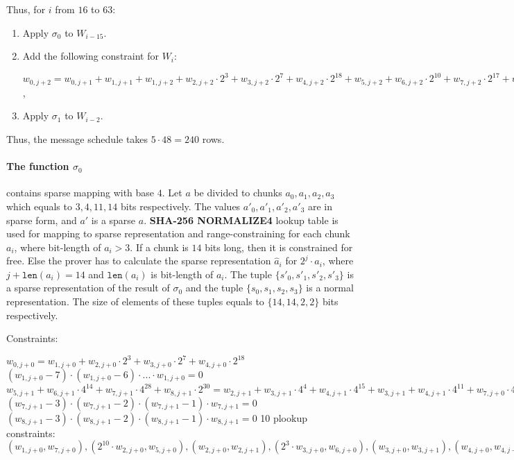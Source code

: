 Thus, for $i$ from $16$ to $63$:
\begin{enumerate}
\item Apply $\sigma_0$ to $W_{i-15}$.
\item Add the following constraint for $W_i$:
\begin{center}
	$w_{0,j + 2} = w_{0, j + 1} + w_{1, j + 1} + w_{1, j + 2} + w_{2,j + 2} \cdot 2^3 + w_{3,j + 2} \cdot 2^{7} + w_{4, j + 2} \cdot 2^{18} + w_{5, j + 2} + w_{6, j + 2} \cdot 2^{10} + w_{7,j + 2} \cdot 2^{17} + w_{8, j + 2} \cdot 2^{19}$,
\end{center}
\item Apply $\sigma_1$ to $W_{i-2}$.
\end{enumerate}
Thus, the message schedule takes $5 \cdot 48 = 240$ rows.

\paragraph{The function $\sigma_0$} contains sparse mapping with base $4$.
Let $a$ be divided to chunks $a_0, a_1, a_2, a_3$ which equals to $3, 4, 11, 14$ bits respectively.
The values $a'_0, a'_1, a'_2, a'_3$ are in sparse form, and $a'$ is a sparse $a$.
\textbf{SHA-256 NORMALIZE4} lookup table is used for mapping to sparse representation and range-constraining for each chunk $a_i$, where bit-length of $a_i > 3$.
If a chunk is $14$ bits long, then it is constrained for free.
Else the prover has to calculate the sparse representation $\hat{a}_i$ for $2^j \cdot a_i$, where $j + \texttt{len}(a_i) = 14$ and $\texttt{len}(a_i)$ is bit-length of $a_i$.
The tuple $\{ s'_0, s'_1, s'_2, s'_3\}$ is a sparse representation of the result of $\sigma_0$ and the tuple $\{ s_0, s_1, s_2, s_3\}$  is a normal representation.
The size of elements of these tuples equals to $\{14, 14, 2, 2\}$ bits respectively.

Constraints:
\begin{center}
    $w_{0, j + 0} = w_{1, j + 0} + w_{2,j + 0} \cdot 2^3 + w_{3,j + 0} \cdot 2^{7} + w_{4, j + 0} \cdot 2^{18}$ \\
    $(w_{1, j + 0} - 7) \cdot (w_{1, j + 0} - 6) \cdot ... \cdot w_{1, j + 0} = 0$ \\
    $w_{5, j + 1} + w_{6, j + 1} \cdot 4^{14} + w_{7, j + 1} \cdot 4^{28} + w_{8, j + 1} \cdot 2^{30} = w_{2, j + 1} + w_{3, j + 1} \cdot 4^{4} + w_{4, j + 1} \cdot 4^{15} + w_{3, j + 1} + w_{4, j + 1} \cdot 4^{11} + w_{7, j + 0} \cdot 4^{25} + w_{2, j + 1} \cdot 4^{28} + w_{4, j + 1} + w_{7, j + 0} \cdot 4^{14}+ w_{2, j + 1} \cdot 4^{17} + w_{3, j + 1} \cdot 4^{21}$ \\
    $(w_{7, j + 1} - 3) \cdot (w_{7, j + 1} - 2) \cdot (w_{7, j + 1} - 1) \cdot w_{7, j + 1} = 0$
    $(w_{8, j + 1} - 3) \cdot (w_{8, j + 1} - 2) \cdot (w_{8, j + 1} - 1) \cdot w_{8, j + 1} = 0$
    10 plookup constraints: $(w_{1, j + 0}, w_{7, j + 0}), ( 2^{10} \cdot w_{2, j + 0}, w_{5, j + 0}), (w_{2, j + 0}, w_{2, j + 1}), (2^3 \cdot w_{3, j + 0}, w_{6, j + 0}), (w_{3, j + 0}, w_{3, j + 1}), (w_{4, j + 0}, w_{4, j + 1}), (w_{1, j + 2}, w_{5, j + 1}), (w_{2, j + 2}, w_{6, j + 1}), (w_{3, j + 2}, w_{7, j + 2}), (w_{4, j + 2}, w_{8, j + 2})$ \\
\end{center}

